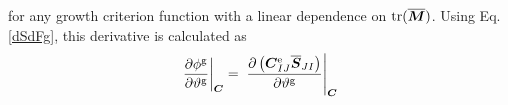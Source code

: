 \documentclass[10pt,letterpaper,oneside]{report}
\newcommand{\ten}[1]{\mbox{\boldmath $#1$}{}}
\newcommand{\scas}[1]{\mbox{{\scriptsize{${\rm{#1}}$}}}{}}
\newcommand{\tens}[1]{\mbox{\boldmath{\scriptsize{$#1$}}}{}}
\begin{document}
for any growth criterion function with a linear dependence on $\mbox{tr} ( \overline{\ten{M}} )$.  Using Eq. \ref{dSdFg}, this derivative is calculated as 
\begin{align}
\left. \frac{\partial \phi^{\scas{g}}}{\partial \vartheta^{\scas{g}}} \right|_{\tens{C}}
={}& \left. \frac{ \partial \left( \ten{C}^{\scas{e}}_{IJ} \overline{\ten{S}}_{JI} \right)}{\partial \vartheta^{\scas{g}}} \right|_{\tens{C}}
\notag \\

\end{align}
\end{document}
